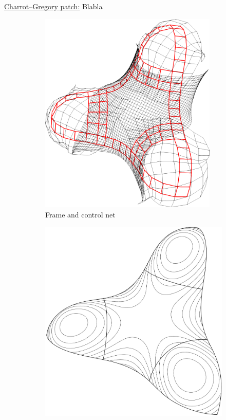 \documentclass{article}
\begin{document}
\vspace{10pt}
\noindent\underline{Charrot--Gregory patch:}\vspace{0.2em}\newline
Blabla
\begin{figure}[h!]
  \begin{subfigure}{0.23\textwidth}
    \centering
    \includegraphics[width = 0.93\textwidth]{images/trebol3-cnet.png}
    \caption{Frame and control net}
    \label{fig:trebol-cnet}
  \end{subfigure}
  \begin{subfigure}{0.23\textwidth}
    \includegraphics[width = \textwidth]{images/trebol3-contour.jpg}

\end{subfigure}
\end{figure}
\end{document}

